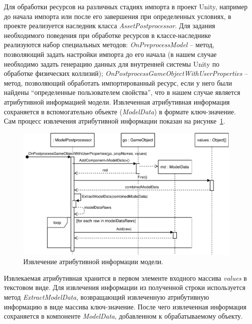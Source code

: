 Для обработки ресурсов на различных стадиях импорта в проект Unity,
например до начала импорта или после его завершения при определенных условиях,
в проекте реализуется наследник класса \emph{AssetPostprocessor}.
Для задания необходимого поведения при обработке ресурсов
в классе-наследнике реализуются набор специальных методов:
\emph{OnPreprocessModel} -- метод, позволяющий задать настройки импорта до его начала
(в нашем случае необходимо задать генерацию данных для внутренней
системы Unity по обработке физических коллизий);
\emph{OnPostprocessGameObjectWithUserProperties} -- метод, позволяющий
обработать импортированный ресурс, если у него были найдены
``определенные пользователем свойства'', что в нашем случае
является атрибутивной информацией модели.%
\cite{DocUnity}
Извлеченная атрибутивная информация сохраняется в вспомогательно объекте
(\emph{ModelData}) в формате ключ-значение.
Сам процесс извлечения атрибутивной информации показан
на рисунке~\ref{figure:SPostprocessor}.

\begin{figure}[ht]
    \centering
    \includegraphics[width=1.0\textwidth]{images/UML-SPostprocessor.pdf}
    \caption{Извлечение атрибутивной информации модели.}
    \label{figure:SPostprocessor}
\end{figure}

Извлекаемая атрибутивная хранится в первом элементе
входного массива \emph{values} в текстовом виде.%
\cite{DocUnity}
Для извлечения информации из полученной строки используется метод
\emph{ExtractModelData}, возвращающий извлеченную атрибутивную информацию
в виде массива ключ-значение.
После чего извлеченная информация сохраняется в компоненте \emph{ModelData},
добавленном к обрабатываемому объекту.
